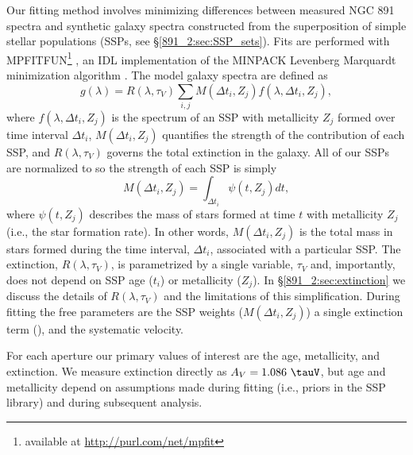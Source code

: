 Our fitting method involves minimizing differences between measured
NGC 891 spectra and synthetic galaxy spectra constructed from the
superposition of simple stellar populations (SSPs, see
\S\ref{891_2:sec:SSP_sets}). Fits are performed with
MPFITFUN\footnote{available at \url{http://purl.com/net/mpfit}}
\citep{Markwardt09}, an IDL implementation of the MINPACK Levenberg
Marquardt minimization algorithm \citep{More78}. The model galaxy
spectra are defined as
\begin{equation}
\label{891_2:eq:SSP_galaxy}
g(\lambda) = R(\lambda,\tau_V) \sum_{i,j} M(\Delta t_i,Z_j)
f(\lambda,\Delta t_i, Z_j),
\end{equation}
where $f(\lambda, \Delta t_i, Z_j)$ is the spectrum of an SSP with
metallicity $Z_j$ formed over time interval $\Delta t_i$, $M(\Delta
t_i,Z_j)$ quantifies the strength of the contribution of each SSP, and
$R(\lambda, \tau_V)$ governs the total extinction in the galaxy. All of our
SSPs are normalized to  so the strength of each SSP is
simply
\begin{equation}
\label{891_2:eq:fit_weight}
M(\Delta t_i,Z_j) = \int_{\Delta t_i} \psi(t, Z_j) dt,
\end{equation}
where $\psi(t, Z_j)$ describes the mass of stars formed at time $t$
with metallicity $Z_j$ (i.e., the star formation rate). In other
words, $M(\Delta t_i,Z_j)$ is the total mass in stars formed during
the time interval, $\Delta t_i$, associated with a particular SSP. The
extinction, $R(\lambda, \tau_V)$, is parametrized by a single
variable, $\tau_V$ and, importantly, does not depend on SSP age
($t_i$) or metallicity ($Z_j$). In \S\ref{891_2:sec:extinction} we
discuss the details of $R(\lambda, \tau_V)$ and the limitations of
this simplification. During fitting the free parameters are the SSP
weights ($M(\Delta t_i,Z_j)$) a single extinction term (\tauV), and the
systematic velocity.


For each aperture our primary values of interest are the age,
metallicity, and extinction. We measure extinction directly as $A_V =
1.086\ \tauV$, but age and metallicity depend on assumptions made
during fitting (i.e., priors in the SSP library) and during subsequent
analysis.

